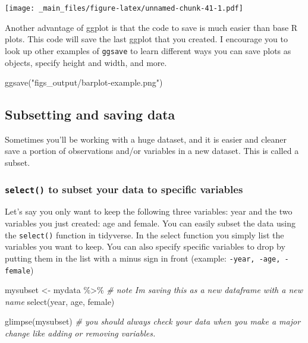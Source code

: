\documentclass[
]{book}
\newenvironment{Shaded}{\begin{snugshade}}{\end{snugshade}}
\newcommand{\CommentTok}[1]{\textcolor[rgb]{0.56,0.35,0.01}{\textit{#1}}}
\newcommand{\FunctionTok}[1]{\textcolor[rgb]{0.00,0.00,0.00}{#1}}
\newcommand{\NormalTok}[1]{#1}
\newcommand{\OtherTok}[1]{\textcolor[rgb]{0.56,0.35,0.01}{#1}}
\newcommand{\SpecialCharTok}[1]{\textcolor[rgb]{0.00,0.00,0.00}{#1}}
\newcommand{\StringTok}[1]{\textcolor[rgb]{0.31,0.60,0.02}{#1}}
\begin{document}
\texttt{[image: \_main\_files/figure-latex/unnamed-chunk-41-1.pdf]}

Another advantage of ggplot is that the code to save is much easier than base R plots. This code will save the last ggplot that you created. I encourage you to look up other examples of \texttt{ggsave} to learn different ways you can save plots as objects, specify height and width, and more.

\begin{Shaded}
\begin{Highlighting}[]
\FunctionTok{ggsave}\NormalTok{(}\StringTok{"figs\_output/barplot{-}example.png"}\NormalTok{)}
\end{Highlighting}
\end{Shaded}

\hypertarget{subsetting-and-saving-data-1}{%
\subsection*{Subsetting and saving data}\label{subsetting-and-saving-data-1}}

Sometimes you'll be working with a huge dataset, and it is easier and cleaner save a portion of observations and/or variables in a new dataset. This is called a subset.

\hypertarget{select}{%
\subsubsection*{\texorpdfstring{\texttt{select()} to subset your data to specific variables}{select() to subset your data to specific variables}}\label{select}}

Let's say you only want to keep the following three variables: year and the two variables you just created: age and female. You can easily subset the data using the \texttt{select()} function in tidyverse. In the select function you simply list the variables you want to keep. You can also specify specific variables to drop by putting them in the list with a minus sign in front (example: \texttt{-year,\ -age,\ -female})

\begin{Shaded}
\begin{Highlighting}[]
\NormalTok{mysubset }\OtherTok{\textless{}{-}}\NormalTok{ mydata }\SpecialCharTok{\%\textgreater{}\%} \CommentTok{\# note I\textquotesingle{}m saving this as a new dataframe with a new name}
  \FunctionTok{select}\NormalTok{(year, age, female)}

\FunctionTok{glimpse}\NormalTok{(mysubset) }\CommentTok{\# you should always check your data when you make a major change like adding or removing variables.}
\end{Highlighting}
\end{Shaded}
\end{document}
